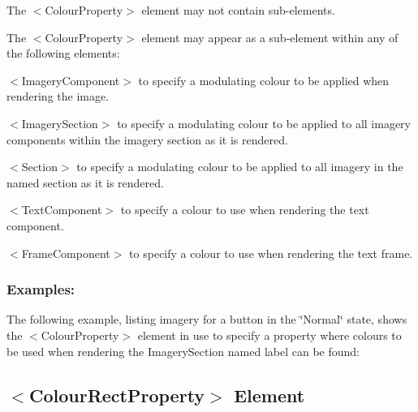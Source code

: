 \begin{DoxyItemize}
\item The {\ttfamily $<$Colour\+Property$>$} element may not contain sub-\/elements.


\item The {\ttfamily $<$Colour\+Property$>$} element may appear as a sub-\/element within any of the following elements\+: 
\begin{DoxyItemize}
\item {\ttfamily $<$Imagery\+Component$>$} to specify a modulating colour to be applied when rendering the image. 
\item {\ttfamily $<$Imagery\+Section$>$} to specify a modulating colour to be applied to all imagery components within the imagery section as it is rendered. 
\item {\ttfamily $<$Section$>$} to specify a modulating colour to be applied to all imagery in the named section as it is rendered. 
\item {\ttfamily $<$Text\+Component$>$} to specify a colour to use when rendering the text component. 
\item {\ttfamily $<$Frame\+Component$>$} to specify a colour to use when rendering the text frame. 
\end{DoxyItemize}
\end{DoxyItemize}\hypertarget{fal_element_ref_fal_elem_ref_sec_6_4}{}\subsubsection{Examples\+:}\label{fal_element_ref_fal_elem_ref_sec_6_4}
The following example, listing imagery for a button in the \char`\"{}\+Normal\char`\"{} state, shows the {\ttfamily $<$Colour\+Property$>$} element in use to specify a property where colours to be used when rendering the Imagery\+Section named \textquotesingle{}label\textquotesingle{} can be found\+: 
\begin{DoxyCode}{0}
\end{DoxyCode}
\hypertarget{fal_element_ref_fal_elem_ref_sec_7}{}\subsection{$<$\+Colour\+Rect\+Property$>$ Element}\label{fal_element_ref_fal_elem_ref_sec_7}
